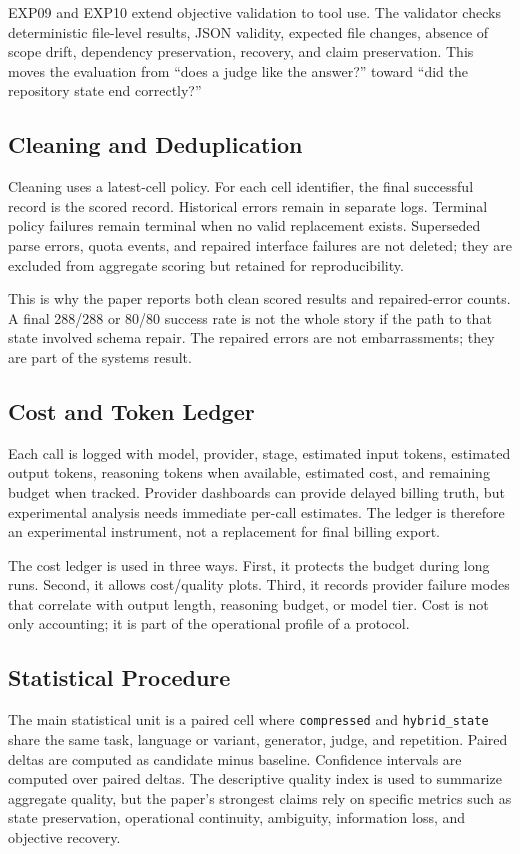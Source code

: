 \documentclass[11pt]{article}
\begin{document}
EXP09 and EXP10 extend objective validation to tool use. The validator checks deterministic file-level results, JSON validity, expected file changes, absence of scope drift, dependency preservation, recovery, and claim preservation. This moves the evaluation from ``does a judge like the answer?'' toward ``did the repository state end correctly?''

\subsection{Cleaning and Deduplication}
Cleaning uses a latest-cell policy. For each cell identifier, the final successful record is the scored record. Historical errors remain in separate logs. Terminal policy failures remain terminal when no valid replacement exists. Superseded parse errors, quota events, and repaired interface failures are not deleted; they are excluded from aggregate scoring but retained for reproducibility.

This is why the paper reports both clean scored results and repaired-error counts. A final 288/288 or 80/80 success rate is not the whole story if the path to that state involved schema repair. The repaired errors are not embarrassments; they are part of the systems result.

\subsection{Cost and Token Ledger}
Each call is logged with model, provider, stage, estimated input tokens, estimated output tokens, reasoning tokens when available, estimated cost, and remaining budget when tracked. Provider dashboards can provide delayed billing truth, but experimental analysis needs immediate per-call estimates. The ledger is therefore an experimental instrument, not a replacement for final billing export.

The cost ledger is used in three ways. First, it protects the budget during long runs. Second, it allows cost/quality plots. Third, it records provider failure modes that correlate with output length, reasoning budget, or model tier. Cost is not only accounting; it is part of the operational profile of a protocol.

\subsection{Statistical Procedure}
The main statistical unit is a paired cell where \texttt{compressed} and \texttt{hybrid\_state} share the same task, language or variant, generator, judge, and repetition. Paired deltas are computed as candidate minus baseline. Confidence intervals are computed over paired deltas. The descriptive quality index is used to summarize aggregate quality, but the paper's strongest claims rely on specific metrics such as state preservation, operational continuity, ambiguity, information loss, and objective recovery.
\end{document}
